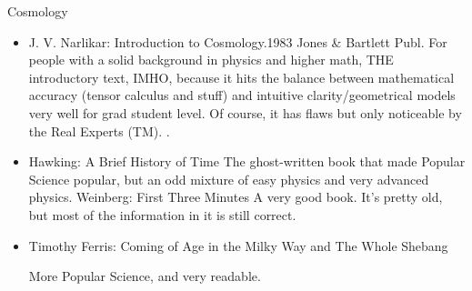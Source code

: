 \documentclass[10pt,a4paper]{book}
\theoremstyle{definition}
\begin{document}
Cosmology
\begin{itemize}
\item J. V. Narlikar: Introduction to Cosmology.1983 Jones \& Bartlett Publ.
For people with a solid background in physics and higher math, THE introductory text, IMHO, because it hits the balance between mathematical accuracy (tensor calculus and stuff) and intuitive clarity/geometrical models very well for grad student level.  Of course, it has flaws but only noticeable by the Real Experts (TM). .
\item Hawking: A Brief History of Time
The ghost-written book that made Popular Science popular, but an odd mixture of easy physics and very advanced physics.
Weinberg: First Three Minutes
A very good book.  It's pretty old, but most of the information in it is still correct.
\item Timothy Ferris: Coming of Age in the Milky Way and The Whole Shebang

More Popular Science, and very readable.


\end{itemize}
\end{document}
